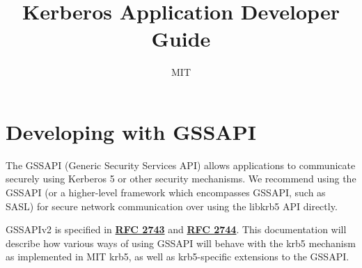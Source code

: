 \documentclass[letterpaper,10pt,english]{sphinxmanual}
\title{Kerberos Application Developer Guide}
\date{ }
\author{MIT}
\begin{document}
\maketitle
\tableofcontents
{}\label{appdev/index::doc}



\chapter{Developing with GSSAPI}
\label{appdev/gssapi:for-application-developers}\label{appdev/gssapi::doc}\label{appdev/gssapi:developing-with-gssapi}
The GSSAPI (Generic Security Services API) allows applications to
communicate securely using Kerberos 5 or other security mechanisms.
We recommend using the GSSAPI (or a higher-level framework which
encompasses GSSAPI, such as SASL) for secure network communication
over using the libkrb5 API directly.

GSSAPIv2 is specified in \href{http://tools.ietf.org/html/rfc2743.html}{\textbf{RFC 2743}} and \href{http://tools.ietf.org/html/rfc2744.html}{\textbf{RFC 2744}}.  This
documentation will describe how various ways of using GSSAPI will
behave with the krb5 mechanism as implemented in MIT krb5, as well as
krb5-specific extensions to the GSSAPI.
\end{document}
